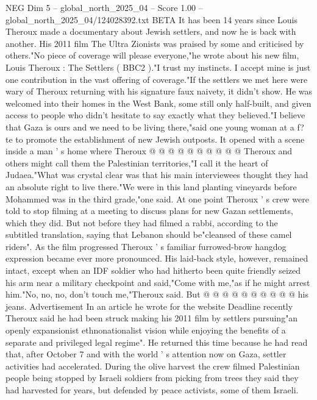 \begin{textsample}{NEG Dim 5 – global\_north\_2025\_04 – Score 1.00 – global\_north\_2025\_04/124028392.txt}  \label{ex:f5_neg_349}
BETA It has been 14 years since Louis Theroux made a documentary about Jewish settlers, and now he is back with another.
His 2011 film The Ultra Zionists was praised by some and criticised by others."No piece of coverage will please everyone,"he wrote about his new film, Louis Theroux : The Settlers ( BBC2 )."I trust my instincts.
I accept mine is just one contribution in the vast offering of coverage."If the settlers we met here were wary of Theroux returning with his signature faux naivety, it didn't show.
He was welcomed into their homes in the West Bank, some still only half-built, and given access to people who didn't hesitate to say exactly what they believed."I believe that Gaza is ours and we need to be living there,"said one young woman at a f? te to promote the establishment of new Jewish outposts.
It opened with a scene inside a man ' s home where Theroux @ @ @ @ @ @ @ @ @ @ Theroux and others might call them the Palestinian territories,"I call it the heart of Judaea."What was crystal clear was that his main interviewees thought they had an absolute right to live there."We were in this land planting vineyards before Mohammed was in the third grade,"one said.
At one point Theroux ' s crew were told to stop filming at a meeting to discuss plans for new Gazan settlements, which they did.
But not before they had filmed a rabbi, according to the subtitled translation, saying that Lebanon should be"cleansed of these camel riders".
As the film progressed Theroux ' s familiar furrowed-brow hangdog expression became ever more pronounced.
His laid-back style, however, remained intact, except when an IDF soldier who had hitherto been quite friendly seized his arm near a military checkpoint and said,"Come with me,"as if he might arrest him."No, no, no, don't touch me,"Theroux said.
But @ @ @ @ @ @ @ @ @ @ his jeans.
Advertisement In an article he wrote for the website Deadline recently Theroux said he had been struck making his 2011 film by settlers pursuing"an openly expansionist ethnonationalist vision while enjoying the benefits of a separate and privileged legal regime".
He returned this time because he had read that, after October 7 and with the world ' s attention now on Gaza, settler activities had accelerated.
During the olive harvest the crew filmed Palestinian people being stopped by Israeli soldiers from picking from trees they said they had harvested for years, but defended by peace activists, some of them Israeli.

\end{textsample}
